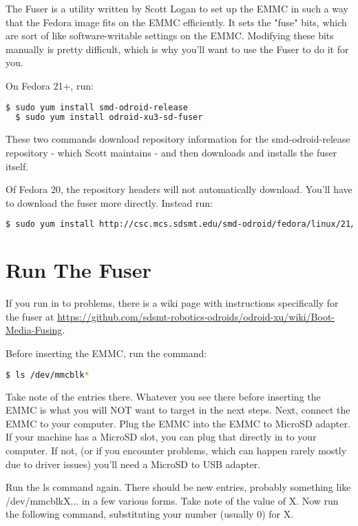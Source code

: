 The Fuser is a utility written by Scott Logan to set up the EMMC in such a way that the Fedora image fits on the EMMC efficiently. It sets the "fuse" bits, which are sort of like software-writable settings on the EMMC. Modifying these bits manually is pretty difficult, which is why you'll want to use the Fuser to do it for you.

On Fedora 21+, run:
\begin{lstlisting}[language=bash]
  $ sudo yum install smd-odroid-release
  $ sudo yum install odroid-xu3-sd-fuser
\end{lstlisting}

These two commands download repository information for the smd-odroid-release repository - which Scott maintains - and then downloads and installs the fuser itself.

Of Fedora 20, the repository headers will not automatically download. You'll have to download the fuser more directly. Instead run:

\begin{lstlisting}[language=bash,breaklines=true]
  $ sudo yum install http://csc.mcs.sdsmt.edu/smd-odroid/fedora/linux/21/x86_64/odroid-xu3-sd-fuser-0.2.0-1.fc21.noarch.rpm
\end{lstlisting}

\section{Run The Fuser}

If you run in to problems, there is a wiki page with instructions specifically for the fuser at \url{https://github.com/sdsmt-robotics-odroids/odroid-xu/wiki/Boot-Media-Fusing}.

Before inserting the EMMC, run the command:

\begin{lstlisting}[language=bash]
  $ ls /dev/mmcblk*
\end{lstlisting}

Take note of the entries there. Whatever you see there before inserting the EMMC is what you will NOT want to target in the next steps. Next, connect the EMMC to your computer. Plug the EMMC into the EMMC to MicroSD adapter. If your machine has a MicroSD slot, you can plug that directly in to your computer. If not, (or if you encounter problems, which can happen rarely mostly due to driver issues) you'll need a MicroSD to USB adapter.

Run the ls command again. There should be new entries, probably something like /dev/mmcblkX... in a few various forms. Take note of the value of X. Now run the following command, substituting your number (usually 0) for X.

